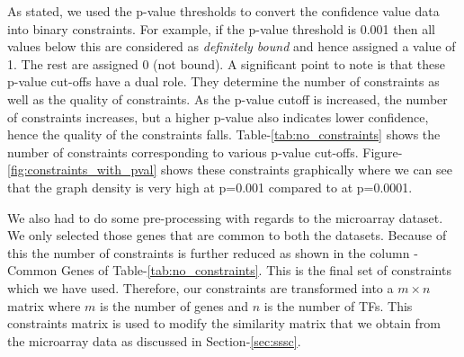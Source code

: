 As stated, we used the p-value thresholds to convert the confidence value data into binary constraints. For example, if the p-value threshold is  0.001 then all values below this are considered as \textit{definitely bound} and hence assigned a value of 1. The rest are assigned 0 (not bound). A significant point to note is that these p-value cut-offs have a dual role. They determine the number of constraints as well as the quality of constraints. As the p-value cutoff is increased, the number of constraints increases, but a higher p-value also indicates lower confidence, hence the quality of the constraints falls. Table-\ref{tab:no_constraints} shows the number of constraints corresponding to various p-value cut-offs. Figure-\ref{fig:constraints_with_pval} shows these constraints graphically where we can see that the graph density is very high at p=0.001 compared to at p=0.0001. 

We also had to do some pre-processing with regards to the microarray dataset. We only selected those genes that are common to both the datasets. Because of this the number of constraints is further reduced as shown in the column - Common Genes of Table-\ref{tab:no_constraints}. This is the final set of constraints which we have used. Therefore, our constraints are transformed into a $m \times n $ matrix where $m$ is the number of genes and $n$ is the number of TFs. This constraints matrix is used to modify the similarity matrix that we obtain from the microarray data as discussed in Section-\ref{sec:sssc}.

